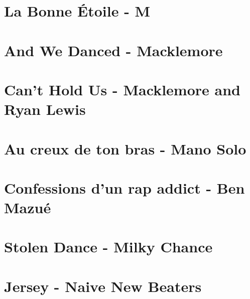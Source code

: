 \documentclass{guitartabs}
\begin{document}
\section{La Bonne Étoile - M}
\begin{guitar}

\end{guitar}

\section{And We Danced - Macklemore}
\begin{guitar}

\end{guitar}

\section{Can't Hold Us - Macklemore and Ryan Lewis}
\begin{guitar}

\end{guitar}

\section{Au creux de ton bras - Mano Solo}
\begin{guitar}

\end{guitar}


\section{Confessions d'un rap addict - Ben Mazué}
\begin{guitar}

\end{guitar}

\section{Stolen Dance - Milky Chance}
\begin{guitar}

\end{guitar}


\section{Jersey - Naive New Beaters}
\begin{guitar}

\end{guitar}
\end{document}
